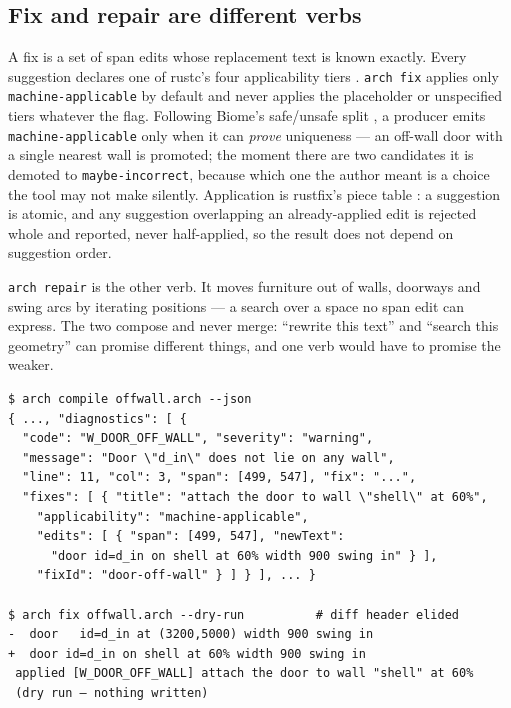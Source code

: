 \documentclass[10pt,conference]{IEEEtran}
\begin{document}
\subsection{Fix and repair are different verbs}
A fix is a set of span edits whose replacement text is known exactly. Every suggestion
declares one of rustc's four applicability tiers
\cite{rustc_applicability}. \texttt{arch fix} applies only
\texttt{machine-applicable} by default and never applies the placeholder or
unspecified tiers whatever the flag. Following Biome's safe/unsafe split
\cite{biome_linter}, a producer emits \texttt{machine-applicable} only when it can
\emph{prove} uniqueness --- an off-wall door with a single nearest wall is promoted;
the moment there are two candidates it is demoted to \texttt{maybe-incorrect}, because
which one the author meant is a choice the tool may not make silently. Application is
rustfix's piece table \cite{rustfix}: a suggestion is atomic, and any suggestion
overlapping an already-applied edit is rejected whole and reported, never
half-applied, so the result does not depend on suggestion order.

\texttt{arch repair} is the other verb. It moves furniture out of walls, doorways and
swing arcs by iterating positions --- a search over a space no span edit can express.
The two compose and never merge: ``rewrite this text'' and ``search this geometry''
can promise different things, and one verb would have to promise the weaker.

\begin{lstlisting}[language={},basicstyle=\ttfamily\tiny,captionpos=b,
  caption={The loop, abridged: \texttt{\ldots} marks elided JSON and several fields sit
  per line where the CLI prints one. Names, values and the diff are unaltered.},
  label={lst:loop}]
$ arch compile offwall.arch --json
{ ..., "diagnostics": [ {
  "code": "W_DOOR_OFF_WALL", "severity": "warning",
  "message": "Door \"d_in\" does not lie on any wall",
  "line": 11, "col": 3, "span": [499, 547], "fix": "...",
  "fixes": [ { "title": "attach the door to wall \"shell\" at 60%",
    "applicability": "machine-applicable",
    "edits": [ { "span": [499, 547], "newText":
      "door id=d_in on shell at 60% width 900 swing in" } ],
    "fixId": "door-off-wall" } ] } ], ... }

$ arch fix offwall.arch --dry-run          # diff header elided
-  door   id=d_in at (3200,5000) width 900 swing in
+  door id=d_in on shell at 60% width 900 swing in
 applied [W_DOOR_OFF_WALL] attach the door to wall "shell" at 60%
 (dry run — nothing written)
\end{lstlisting}
\end{document}
